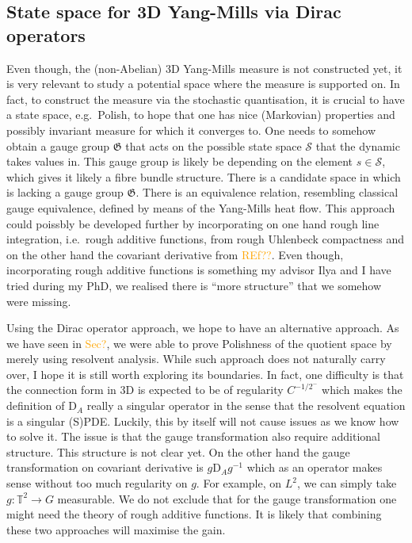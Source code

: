 \documentclass[12pt]{article}
\numberwithin{equation}{section}
\theoremstyle{definition}
\theoremstyle{remark}
\newcommand{\1}{\mathbf 1}
\newcommand{\<}{\langle}
\renewcommand{\>}{\rangle}
\newcommand{\orange}[1]{\textcolor{orange}{#1}}
\newcommand{\cS}{\mathcal S}
\newcommand{\rmD}{\mathrm{D}}
\newcommand{\fG}{\mathfrak{G}}
\newcommand{\bT}{\mathbb T}
\begin{document}
\subsection{State space for 3D Yang-Mills via Dirac operators}
%
Even though, the (non-Abelian) 3D Yang-Mills measure is not constructed yet, it is very relevant to study a potential space where the measure is supported on. In fact, to construct the measure via the stochastic quantisation, it is crucial to have a state space, e.g.\ Polish, to hope that one has nice (Markovian) properties and possibly invariant measure for which it converges to. One needs to somehow obtain a gauge group $\fG$ that acts on the possible state space $\cS$ that the dynamic takes values in. This gauge group is likely be depending on the element $s\in\cS$, which gives it likely a fibre bundle structure. There is a candidate space in \cite{CCHS3D} which is lacking a gauge group $\fG$. There is an equivalence relation, resembling classical gauge equivalence, defined by means of the Yang-Mills heat flow. This approach could poissbly be developed further by incorporating on one hand rough line integration, i.e.\ rough additive functions, from rough Uhlenbeck compactness and on the other hand the covariant derivative from \orange{REf??}. Even though, incorporating rough additive functions is something my advisor Ilya and I have tried during my PhD, we realised there is ``more structure'' that we somehow were missing. 

Using the Dirac operator approach, we hope to have an alternative approach. As we have seen in \orange{Sec?}, we were able to prove Polishness of the quotient space by merely using resolvent analysis. While such approach does not naturally carry over, I hope it is still worth exploring its boundaries. In fact, one difficulty is that the connection form in 3D is expected to be of regularity $C^{-1/2^-}$ which makes the definition of $\rmD_A$ really a singular operator in the sense that the resolvent equation is a singular (S)PDE. Luckily, this by itself will not cause issues as we know how to solve it. The issue is that the gauge transformation also require additional structure. This structure is not clear yet. On the other hand the gauge transformation on covariant derivative is $g\rmD_Ag^{-1}$ which as an operator makes sense without too much regularity on $g$. For example, on $L^2$, we can simply take $g:\bT^2\to G$ measurable. We do not exclude that for the gauge transformation one might need the theory of rough additive functions. It is likely that combining these two approaches will maximise the gain. 
\end{document}
